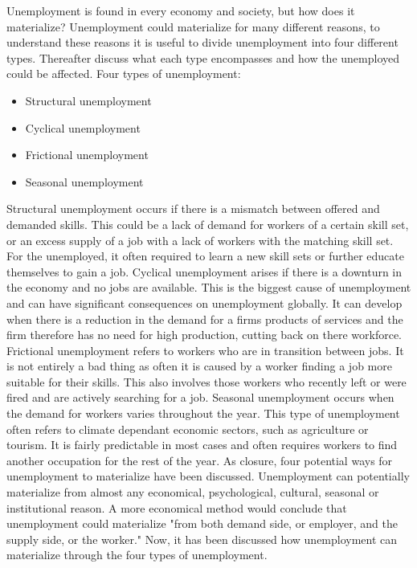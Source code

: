 Unemployment is found in every economy and society, but how does it materialize?
Unemployment could materialize for many different reasons, to understand these reasons it is useful to divide unemployment into four different types.
Thereafter discuss what each type encompasses and how the unemployed could be affected.
Four types of unemployment: \\
\begin{itemize}
   \item  Structural unemployment
   \item  Cyclical unemployment
   \item  Frictional unemployment
   \item  Seasonal unemployment\cite{Four_types_of_unemployment}
\end{itemize} 
Structural unemployment occurs if there is a mismatch between offered and demanded skills.
This could be a lack of demand for workers of a certain skill set, or an excess supply of a job with a lack of workers with the matching skill set.
For the unemployed, it often required to learn a new skill sets or further educate themselves to gain a job.
Cyclical unemployment arises if there is a downturn in the economy and no jobs are available.
This is the biggest cause of unemployment and can have significant consequences on unemployment globally. \cite{Understanding_four_types_of_unemployment}
It can develop when there is a reduction in the demand for a firms products of services and the firm therefore has no need for high production, cutting back on there workforce. 
Frictional unemployment refers to workers who are in transition between jobs. 
It is not entirely a bad thing as often it is caused by a worker finding a job more suitable for their skills.
This also involves those workers who recently left or were fired and are actively searching for a job.
Seasonal unemployment occurs when the demand for workers varies throughout the year.
This type of unemployment often refers to climate dependant economic sectors, such as agriculture or tourism.
It is fairly predictable in most cases and often requires workers to find another occupation for the rest of the year. 
As closure, four potential ways for unemployment to materialize have been discussed.
Unemployment can potentially materialize from almost any economical, psychological, cultural, seasonal or institutional reason. 
A more economical method would conclude that unemployment could materialize "from both demand side, or employer, and the supply side, or the worker." \cite{Economical_theory_behind_unemployment}
Now, it has been discussed how unemployment can materialize through the four types of unemployment. \cite{Guide_to_unemployment}   \\

